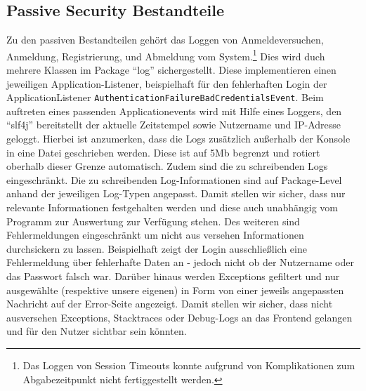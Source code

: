 \subsection{Passive Security Bestandteile}
Zu den passiven Bestandteilen gehört das Loggen von Anmeldeversuchen, Anmeldung, Registrierung, und Abmeldung vom System.\footnote{Das Loggen von Session Timeouts konnte aufgrund von Komplikationen zum Abgabezeitpunkt nicht fertiggestellt werden.}
Dies wird duch mehrere Klassen im Package \enquote{log} sichergestellt. Diese implementieren einen jeweiligen Application-Listener, beispielhaft für den fehlerhaften Login der ApplicationListener \texttt{AuthenticationFailureBadCredentialsEvent}. Beim auftreten eines passenden Applicationevents wird mit Hilfe eines Loggers, den \enquote{slf4j} bereitstellt der aktuelle Zeitstempel sowie Nutzername und IP-Adresse geloggt.
Hierbei ist anzumerken, dass die Logs zusätzlich außerhalb der Konsole in eine Datei geschrieben werden. Diese ist auf 5Mb begrenzt und rotiert oberhalb dieser Grenze automatisch.
Zudem sind die zu schreibenden Logs eingeschränkt. Die zu schreibenden Log-Informationen sind auf Package-Level anhand der jeweiligen Log-Typen angepasst.
Damit stellen wir sicher, dass nur relevante Informationen festgehalten werden und diese auch unabhängig vom Programm zur Auswertung zur Verfügung stehen.
Des weiteren sind Fehlermeldungen eingeschränkt um nicht aus versehen Informationen durchsickern zu lassen. Beispielhaft zeigt der Login ausschließlich eine Fehlermeldung über fehlerhafte Daten an - jedoch nicht ob der Nutzername oder das Passwort falsch war.
Darüber hinaus werden Exceptions gefiltert und nur ausgewählte (respektive unsere eigenen) in Form von einer jeweils angepassten Nachricht auf der Error-Seite angezeigt. Damit stellen wir sicher, dass nicht ausversehen Exceptions, Stacktraces oder Debug-Logs an das Frontend gelangen und für den Nutzer sichtbar sein könnten.

